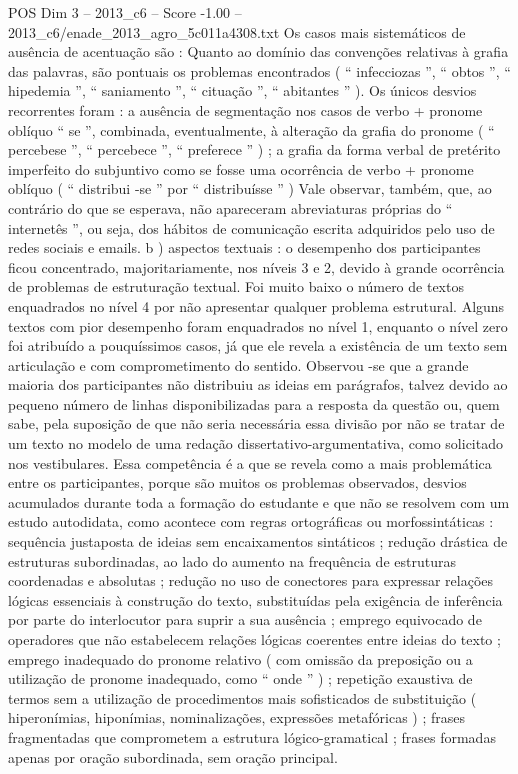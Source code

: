 \begin{textsample}{POS Dim 3 – 2013\_c6 – Score -1.00 – 2013\_c6/enade\_2013\_agro\_5c011a4308.txt}
Os casos mais sistemáticos de ausência de acentuação são : Quanto ao domínio das convenções relativas à grafia das palavras, são pontuais os problemas encontrados ( “ infecciozas ”, “ obtos ”, “ hipedemia ”, “ saniamento ”, “ cituação ”, “ abitantes ” ).
Os únicos desvios recorrentes foram : a ausência de segmentação nos casos de verbo + pronome oblíquo “ se ”, combinada, eventualmente, à alteração da grafia do pronome ( “ percebese ”, “ percebece ”, “ preferece ” ) ; a grafia da forma verbal de pretérito imperfeito do subjuntivo como se fosse uma ocorrência de verbo + pronome oblíquo ( “ distribui -se ” por “ distribuísse ” ) Vale observar, também, que, ao contrário do que se esperava, não apareceram abreviaturas próprias do “ internetês ”, ou seja, dos hábitos de comunicação escrita adquiridos pelo uso de redes sociais e emails. b ) aspectos textuais : o desempenho dos participantes ficou concentrado, majoritariamente, nos níveis 3 e 2, devido à grande ocorrência de problemas de estruturação textual.
Foi muito baixo o número de textos enquadrados no nível 4 por não apresentar qualquer problema estrutural.
Alguns textos com pior desempenho foram enquadrados no nível 1, enquanto o nível zero foi atribuído a pouquíssimos casos, já que ele revela a existência de um texto sem articulação e com comprometimento do sentido.
Observou -se que a grande maioria dos participantes não distribuiu as ideias em parágrafos, talvez devido ao pequeno número de linhas disponibilizadas para a resposta da questão ou, quem sabe, pela suposição de que não seria necessária essa divisão por não se tratar de um texto no modelo de uma redação dissertativo-argumentativa, como solicitado nos vestibulares.
Essa competência é a que se revela como a mais problemática entre os participantes, porque são muitos os problemas observados, desvios acumulados durante toda a formação do estudante e que não se resolvem com um estudo autodidata, como acontece com regras ortográficas ou morfossintáticas : sequência justaposta de ideias sem encaixamentos sintáticos ; redução drástica de estruturas subordinadas, ao lado do aumento na frequência de estruturas coordenadas e absolutas ; redução no uso de conectores para expressar relações lógicas essenciais à construção do texto, substituídas pela exigência de inferência por parte do interlocutor para suprir a sua ausência ; emprego equivocado de operadores que não estabelecem relações lógicas coerentes entre ideias do texto ; emprego inadequado do pronome relativo ( com omissão da preposição ou a utilização de pronome inadequado, como “ onde ” ) ; repetição exaustiva de termos sem a utilização de procedimentos mais sofisticados de substituição ( hiperonímias, hiponímias, nominalizações, expressões metafóricas ) ; frases fragmentadas que comprometem a estrutura lógico-gramatical ; frases formadas apenas por oração subordinada, sem oração principal.

\end{textsample}
